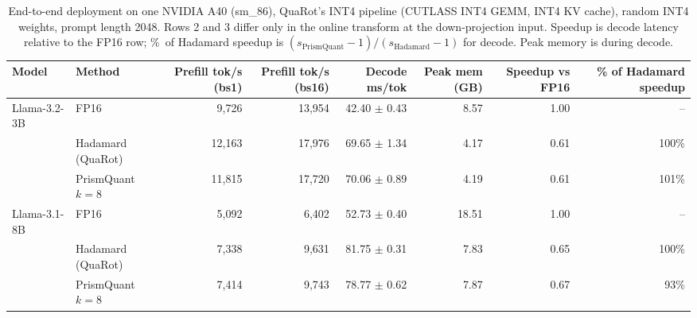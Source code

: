\begin{table}[t]
\centering
\small
\caption{End-to-end deployment on one NVIDIA A40 (sm\_86), QuaRot's INT4 pipeline (CUTLASS INT4 GEMM, INT4 KV cache), random INT4 weights, prompt length 2048. Rows 2 and 3 differ only in the online transform at the down-projection input. Speedup is decode latency relative to the FP16 row; \%~of Hadamard speedup is $(s_{\mathrm{PrismQuant}}-1)/(s_{\mathrm{Hadamard}}-1)$ for decode. Peak memory is during decode.}
\label{tab:e28}
\begin{tabular}{llrrrrrr}
\toprule
Model & Method & Prefill tok/s (bs1) & Prefill tok/s (bs16) & Decode ms/tok & Peak mem (GB) & Speedup vs FP16 & \% of Hadamard speedup \\
\midrule
Llama-3.2-3B & FP16 & 9,726 & 13,954 & 42.40 $\pm$ 0.43 & 8.57 & 1.00 & -- \\
 & Hadamard (QuaRot) & 12,163 & 17,976 & 69.65 $\pm$ 1.34 & 4.17 & 0.61 & 100\% \\
 & PrismQuant $k{=}8$ & 11,815 & 17,720 & 70.06 $\pm$ 0.89 & 4.19 & 0.61 & 101\% \\
\midrule
Llama-3.1-8B & FP16 & 5,092 & 6,402 & 52.73 $\pm$ 0.40 & 18.51 & 1.00 & -- \\
 & Hadamard (QuaRot) & 7,338 & 9,631 & 81.75 $\pm$ 0.31 & 7.83 & 0.65 & 100\% \\
 & PrismQuant $k{=}8$ & 7,414 & 9,743 & 78.77 $\pm$ 0.62 & 7.87 & 0.67 & 93\% \\
\bottomrule
\end{tabular}
\end{table}
